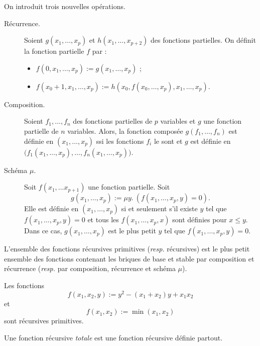 \documentclass[./main]{subfiles}
\begin{document}
  On introduit trois nouvelles opérations.
  \begin{description}
    \item[Récurrence.]
      Soient $g(x_1, \ldots, x_p)$ et $h(x_1, \ldots, x_{p+2})$ des fonctions partielles.
      On définit la fonction partielle $f$ par :
      \begin{itemize}
        \item $f(0, x_1, \ldots, x_p) := g(x_1, \ldots, x_p)$ ;
        \item $f(x_0 + 1, x_1, \ldots, x_p) := h(x_0, f(x_0, \ldots, x_p), x_1, \ldots, x_p)$.
      \end{itemize}
    \item[Composition.]
      Soient $f_1, \ldots, f_n$ des fonctions partielles de $p$ variables et $g$ une fonction partielle de $n$ variables.
      Alors, la fonction composée $g(f_1, \ldots, f_n)$ est définie en $(x_1, \ldots, x_p)$ ssi les fonctions $f_i$ le sont et $g$ est définie en $\big( f_1(x_1, \ldots, x_p), \ldots, f_n(x_1, \ldots, x_p)\big)$.
    \item[Schéma $\mu$.]
      Soit $f(x_1, \ldots x_{p+1})$ une fonction partielle.
      Soit \[
        g(x_1, \ldots, x_p) := \mu y.\: (f(x_1, \ldots, x_p, y) = 0)
      .\]
      Elle est définie en $(x_1, \ldots, x_p)$ si et seulement s'il existe $y$ tel que $f(x_1, \ldots, x_p, y) = 0$ et tous les $f(x_1, \ldots, x_p, x)$ sont définies pour $x \le y$.
      Dans ce cas, $g(x_1, \ldots, x_p)$ est le plus petit $y$ tel que $f(x_1, \ldots, x_p, y) = 0$.
  \end{description}

  \begin{defn}
    L'ensemble des fonctions récursives primitives (\textit{resp.} récursives) est le plus petit ensemble des fonctions contenant les briques de base et stable par composition  et récurrence (\textit{resp.} par composition, récurrence et schéma $\mu$).
  \end{defn}

  \begin{exm}
    Les fonctions \[
    f(x_1, x_2, y) := y^2 - (x_1+x_2) y + x_1 x_2
    \]et\[
    f(x_1, x_2) := \min(x_1, x_2)
    \] sont récursives primitives.
  \end{exm}

  \begin{defn}
    Une fonction récursive \textit{totale} est une fonction récursive définie partout.
  \end{defn}
\end{document}
